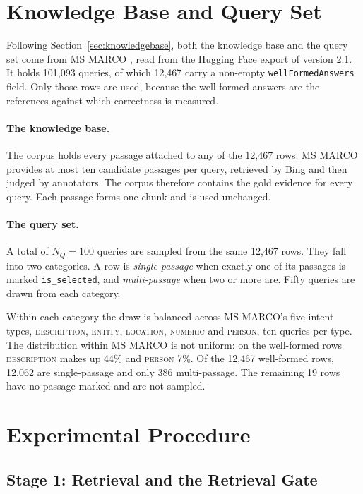 \documentclass[12pt,a4paper,oneside]{scrreprt}
\begin{document}
\section{Knowledge Base and Query Set}
\label{sec:corpus}

Following Section~\ref{sec:knowledgebase}, both the knowledge base and the query set come from MS MARCO \citep{nguyen2016msmarco}, read from the Hugging Face export of version 2.1. It holds 101,093 queries, of which 12,467 carry a non-empty \texttt{wellFormedAnswers} field. Only those rows are used, because the well-formed answers are the references against which correctness is measured.

\paragraph{The knowledge base.} The corpus holds every passage attached to any of the 12,467 rows. MS MARCO provides at most ten candidate passages per query, retrieved by Bing and then judged by annotators. The corpus therefore contains the gold evidence for every query. Each passage forms one chunk and is used unchanged. 

\paragraph{The query set.} A total of $N_Q = 100$ queries are sampled from the same 12,467 rows. They fall into two categories. A row is \textit{single-passage} when exactly one of its passages is marked \texttt{is\_selected}, and \textit{multi-passage} when two or more are. Fifty queries are drawn from each category.

Within each category the draw is balanced across MS MARCO's five intent types, \textsc{description}, \textsc{entity}, \textsc{location}, \textsc{numeric} and \textsc{person}, ten queries per type. The distribution within MS MARCO is not uniform: on the well-formed rows \textsc{description} makes up 44\% and \textsc{person} 7\%. Of the 12,467 well-formed rows, 12,062 are single-passage and only 386 multi-passage. The remaining 19 rows have no passage marked and are not sampled.

\section{Experimental Procedure}
\label{sec:procedure}

\subsection{Stage 1: Retrieval and the Retrieval Gate}
\end{document}
